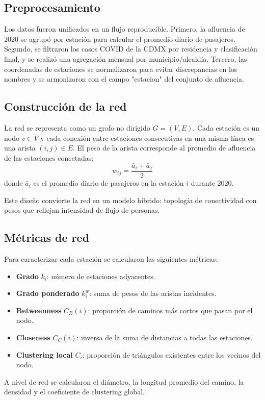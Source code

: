 \documentclass[10pt,twocolumn]{article}
\begin{document}
\subsection{Preprocesamiento}
Los datos fueron unificados en un flujo reproducible. Primero, la afluencia de 2020 se agrupó por estación para calcular el promedio diario de pasajeros. Segundo, se filtraron los casos COVID de la CDMX por residencia y clasificación final, y se realizó una agregación mensual por municipio/alcaldía. Tercero, las coordenadas de estaciones se normalizaron para evitar discrepancias en los nombres y se armonizaron con el campo "estacion" del conjunto de afluencia.

\subsection{Construcción de la red}
La red se representa como un grafo no dirigido $G=(V,E)$. Cada estación es un nodo $v \in V$ y cada conexión entre estaciones consecutivas en una misma línea es una arista $(i,j) \in E$. El peso de la arista corresponde al promedio de afluencia de las estaciones conectadas:
\begin{equation}
w_{ij} = \frac{\bar{a}_i + \bar{a}_j}{2}
\end{equation}
donde $\bar{a}_i$ es el promedio diario de pasajeros en la estación $i$ durante 2020.

Este diseño convierte la red en un modelo híbrido: topología de conectividad con pesos que reflejan intensidad de flujo de personas.

\subsection{Métricas de red}
Para caracterizar cada estación se calcularon las siguientes métricas:
\begin{itemize}[nosep,leftmargin=*]
    \item \textbf{Grado} $k_i$: número de estaciones adyacentes.
    \item \textbf{Grado ponderado} $k_i^w$: suma de pesos de las aristas incidentes.
    \item \textbf{Betweenness} $C_B(i)$: proporción de caminos más cortos que pasan por el nodo.
    \item \textbf{Closeness} $C_C(i)$: inversa de la suma de distancias a todas las estaciones.
    \item \textbf{Clustering local} $C_i$: proporción de triángulos existentes entre los vecinos del nodo.
\end{itemize}
A nivel de red se calcularon el diámetro, la longitud promedio del camino, la densidad y el coeficiente de clustering global.
\end{document}
